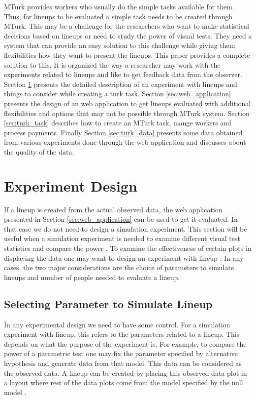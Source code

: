 \documentclass[11pt]{article}
\begin{document}
MTurk provides workers who usually do the simple tasks available for them. Thus, for lineups to be evaluated a simple task needs to be created through MTurk. This may be a challenge for the researchers who want to make statistical decisions based on lineups or need to study the power of visual tests. They need a system that can provide an easy solution to this challenge while giving them flexibilities how they want to present the lineups. This paper provides a complete solution to this. It is organized the way a researcher may work with the experiments related to lineups and like to get feedback data from the observer. Section \ref{sec:turk_exp} presents the detailed description of an experiment with lineups and things to consider while creating a turk task. Section \ref{sec:web_application} presents the design of an web application to get lineups evaluated with additional flexibilities and options that may not be possible through MTurk system. Section \ref{sec:turk_task} describes how to create an MTurk task, mange workers and process payments. Finally Section \ref{sec:turk_data} presents some data obtained from various experiments done through the web application and discusses about the quality of the data.


\section{Experiment Design} \label{sec:turk_exp}

If a lineup is created from the actual observed data, the web application presented in Section \ref{sec:web_application} can be used to get it evaluated. In that case we do not need to design a simulation experiment. This section will be useful when a simulation experiment is needed to examine different visual test statistics and compare the power \citep{majumder:2013}. To examine the effectiveness of certain plots in displaying the data one may want to design an experiment with lineup \citep{heike:2012}. In any cases, the two major considerations are the choice of parameters to simulate lineups and number of people needed to evaluate a lineup.

\subsection{Selecting Parameter to Simulate Lineup} \label{sec:parameter_selection} In any experimental design we need to have some control. For a simulation experiment with lineup, this refers to the parameters related to a lineup. This depends on what the purpose of the experiment is. For example, to compare the power of a parametric test one may fix the parameter specified by alternative hypothesis and generate data from that model. This data can be considered as the observed data. A lineup can be created by placing this observed data plot in a layout where rest of the data plots come from the model specified by the null model \citep{majumder:2013}. 
\end{document}
